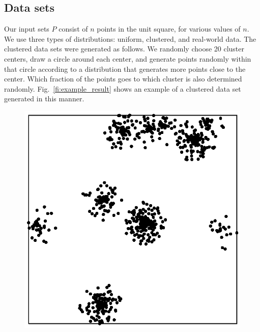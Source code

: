 \documentclass{elsart}
\begin{document}
\subsection{Data sets}
Our input sets $P$ consist of $n$ points in the unit square, for
various values of $n$.  We use three types of distributions: uniform,
clustered, and real-world data.  The clustered data sets were
generated as follows. We randomly choose 20 cluster centers, draw a
circle around each center, and generate points randomly within that
circle according to a distribution that generates more points close to
the center. Which fraction of the points goes to which cluster is also
determined randomly.  Fig.~\ref{fi:example_result} shows an example of
a clustered data set generated in this manner.
\begin{figure}[htb]
\begin{center}
    \hbox{\hbox{\includegraphics[scale=1]{cities1000}}
}
\end{center}
\end{figure}
\end{document}
